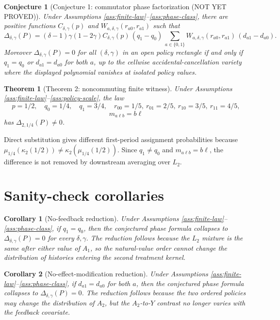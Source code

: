 \documentclass[11pt]{article}
\theoremstyle{definition}
\theoremstyle{plain}
\newtheorem{theorem}{Theorem}
\newtheorem{conjecture}{Conjecture}
\newtheorem{corollary}{Corollary}
\theoremstyle{remark}
\begin{document}
\begin{conjecture}[Conjecture 1: commutator phase factorization (NOT YET PROVED)]\label{conj:phase}
Under Assumptions \ref{ass:finite-law}--\ref{ass:phase-class}, there are positive functions \(C_{\delta,\gamma}(p)\) and \(W_{a,\delta,\gamma}(r_{a0},r_{a1})\) such that
\[
\Delta_{\delta,\gamma}(P)
=
(\delta-1)\gamma(1-2\gamma)C_{\delta,\gamma}(p)\,
(q_1-q_0)\,
\sum_{a\in\{0,1\}} W_{a,\delta,\gamma}(r_{a0},r_{a1})\,(d_{a1}-d_{a0}).
\]
Moreover \(\Delta_{\delta,\gamma}(P)=0\) for all \((\delta,\gamma)\) in an open policy rectangle if and only if \(q_1=q_0\) or \(d_{a1}=d_{a0}\) for both \(a\), up to the cellwise accidental-cancellation variety where the displayed polynomial vanishes at isolated policy values.
\end{conjecture}

\begin{theorem}[Theorem 2: noncommuting finite witness]\label{thm:witness}
Under Assumptions \ref{ass:finite-law}--\ref{ass:policy-scale}, the law
\[
p=1/2,\quad q_0=1/4,\quad q_1=3/4,\quad
r_{00}=1/5,\ r_{01}=2/5,\ r_{10}=3/5,\ r_{11}=4/5,
\]
\[
m_{a\ell b}=b\ell
\]
has \(\Delta_{2,1/4}(P)\ne0\).
\end{theorem}
Direct substitution gives different first-period assignment probabilities because \(\mu_{1/4}(\kappa_2(1/2))\ne \kappa_2(\mu_{1/4}(1/2))\). Since \(q_1\ne q_0\) and \(m_{a\ell b}=b\ell\), the difference is not removed by downstream averaging over \(L_2\).

\section{Sanity-check corollaries}
\begin{corollary}[No-feedback reduction]\label{cor:no-feedback}
Under Assumptions \ref{ass:finite-law}--\ref{ass:phase-class}, if \(q_1=q_0\), then the conjectured phase formula collapses to \(\Delta_{\delta,\gamma}(P)=0\) for every \(\delta,\gamma\). The reduction follows because the \(L_2\) mixture is the same after either value of \(A_1\), so the natural-value order cannot change the distribution of histories entering the second treatment kernel.
\end{corollary}

\begin{corollary}[No-effect-modification reduction]\label{cor:no-em}
Under Assumptions \ref{ass:finite-law}--\ref{ass:phase-class}, if \(d_{a1}=d_{a0}\) for both \(a\), then the conjectured phase formula collapses to \(\Delta_{\delta,\gamma}(P)=0\). The reduction follows because the two ordered policies may change the distribution of \(A_2\), but the \(A_2\)-to-\(Y\) contrast no longer varies with the feedback covariate.
\end{corollary}
\end{document}
